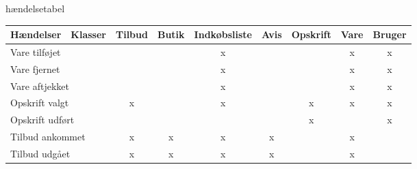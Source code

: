 hændelsetabel
\begin{table}[h]
\begin{tabular}{|l|l|c|c|c|c|c|c|c|}
\hline
Hændelser                  & Klasser                & \multicolumn{1}{l|}{Tilbud} & \multicolumn{1}{l|}{Butik} & \multicolumn{1}{l|}{Indkøbsliste} & \multicolumn{1}{l|}{Avis} & \multicolumn{1}{l|}{Opskrift} & \multicolumn{1}{l|}{Vare} & \multicolumn{1}{l|}{Bruger} \\ \hline
\multicolumn{2}{|l|}{Vare tilføjet}                 &                             &                            & x                                 &                           &                               & x                         & x                           \\ \hline
\multicolumn{2}{|l|}{Vare fjernet}                  &                             &                            & x                                 &                           &                               & x                         & x                           \\ \hline
\multicolumn{2}{|l|}{Vare aftjekket}                &                             &                            & x                                 &                           &                               & x                         & x                           \\ \hline
\multicolumn{2}{|l|}{Opskrift valgt}                & x                           &                            & x                                 &                           & x                             & x                         & x                           \\ \hline
\multicolumn{2}{|l|}{Opskrift udført}               &                             &                            &                                   &                           & x                             &                           & x                           \\ \hline
\multicolumn{2}{|l|}{Tilbud ankommet}               & x                           & x                          & x                                 & x                         &                               & x                         &                             \\ \hline
\multicolumn{2}{|l|}{Tilbud udgået}                 & x                           & x                          & x                                 & x                         &                               & x                         &                             \\ \hline

\end{tabular}
\end{table}
